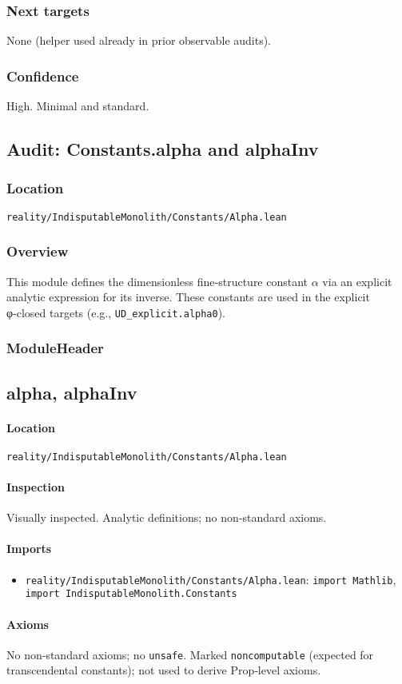 \documentclass{article}
\newcommand{\FileRef}[1]{\texttt{#1}}
\newcommand{\ModuleHeader}[3]{%
  \subsection{#1}
  \paragraph{Location} \FileRef{#2}\\
  \paragraph{Inspection} #3
}
\begin{document}
\subsubsection{Next targets}
None (helper used already in prior observable audits).

\subsubsection{Confidence}
High. Minimal and standard.

\subsection{Audit: Constants.alpha and alphaInv}
\subsubsection{Location}
\FileRef{reality/IndisputableMonolith/Constants/Alpha.lean}

\subsubsection{Overview}
This module defines the dimensionless fine‑structure constant \(\alpha\) via an explicit analytic expression for its inverse. These constants are used in the explicit φ‑closed targets (e.g., \texttt{UD\_explicit.alpha0}).

\subsubsection{ModuleHeader}
\ModuleHeader{alpha, alphaInv}{reality/IndisputableMonolith/Constants/Alpha.lean}{Visually inspected. Analytic definitions; no non‑standard axioms.}

\paragraph{Imports}
\begin{itemize}[leftmargin=*]
  \item \FileRef{reality/IndisputableMonolith/Constants/Alpha.lean}: \texttt{import Mathlib}, \texttt{import IndisputableMonolith.Constants}
\end{itemize}

\paragraph{Axioms}
No non‑standard axioms; no \texttt{unsafe}. Marked \texttt{noncomputable} (expected for transcendental constants); not used to derive Prop‑level axioms.
\end{document}
